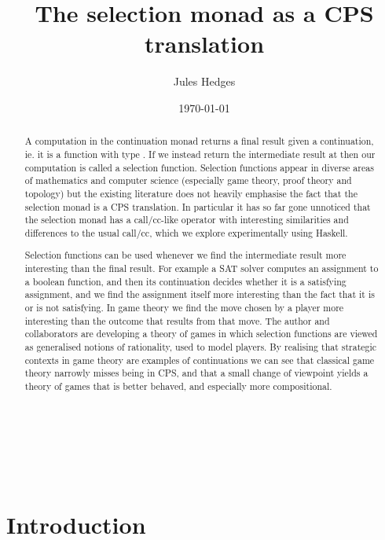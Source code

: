 \documentclass{article}
\title{The selection monad as a CPS translation}
\author{Jules Hedges}
\date\today
\begin{document}
\pagestyle{plain}


\maketitle
\begin{abstract}\noindent
A computation in the continuation monad returns a final result given a continuation, ie. it is a function with type . If we instead return the intermediate result at  then our computation is called a selection function. Selection functions appear in diverse areas of mathematics and computer science (especially game theory, proof theory and topology) but the existing literature does not heavily emphasise the fact that the selection monad is a CPS translation. In particular it has so far gone unnoticed that the selection monad has a call/cc-like operator with interesting similarities and differences to the usual call/cc, which we explore experimentally using Haskell.

Selection functions can be used whenever we find the intermediate result more interesting than the final result. For example a SAT solver computes an assignment to a boolean function, and then its continuation decides whether it is a satisfying assignment, and we find the assignment itself more interesting than the fact that it is or is not satisfying. In game theory we find the move chosen by a player more interesting than the outcome that results from that move. The author and collaborators are developing a theory of games in which selection functions are viewed as generalised notions of rationality, used to model players. By realising that strategic contexts in game theory are examples of continuations we can see that classical game theory narrowly misses being in CPS, and that a small change of viewpoint yields a theory of games that is better behaved, and especially more compositional.
\end{abstract}

\clearpage

\ 

\vfill 

\tableofcontents

\vfill 

\ 

\clearpage




\section{Introduction}
\end{document}
